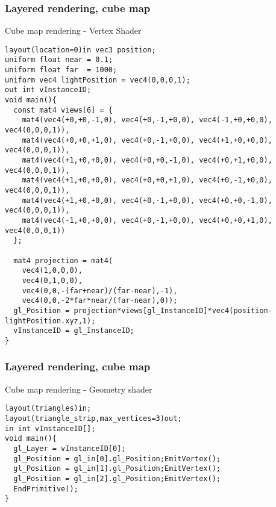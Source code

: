 \begin{frame}[fragile]
\frametitle{Layered rendering, cube map}
Cube map rendering - Vertex Shader
{\scriptsize
\begin{verbatim}
layout(location=0)in vec3 position;
uniform float near = 0.1;
uniform float far  = 1000;
uniform vec4 lightPosition = vec4(0,0,0,1);
out int vInstanceID;
void main(){
  const mat4 views[6] = {
    mat4(vec4(+0,+0,-1,0), vec4(+0,-1,+0,0), vec4(-1,+0,+0,0), vec4(0,0,0,1)),
    mat4(vec4(+0,+0,+1,0), vec4(+0,-1,+0,0), vec4(+1,+0,+0,0), vec4(0,0,0,1)),
    mat4(vec4(+1,+0,+0,0), vec4(+0,+0,-1,0), vec4(+0,+1,+0,0), vec4(0,0,0,1)),
    mat4(vec4(+1,+0,+0,0), vec4(+0,+0,+1,0), vec4(+0,-1,+0,0), vec4(0,0,0,1)),
    mat4(vec4(+1,+0,+0,0), vec4(+0,-1,+0,0), vec4(+0,+0,-1,0), vec4(0,0,0,1)),
    mat4(vec4(-1,+0,+0,0), vec4(+0,-1,+0,0), vec4(+0,+0,+1,0), vec4(0,0,0,1))
  };

  mat4 projection = mat4(
    vec4(1,0,0,0),
    vec4(0,1,0,0),
    vec4(0,0,-(far+near)/(far-near),-1),
    vec4(0,0,-2*far*near/(far-near),0));
  gl_Position = projection*views[gl_InstanceID]*vec4(position-lightPosition.xyz,1);
  vInstanceID = gl_InstanceID;
}
\end{verbatim}
}
\end{frame}


\begin{frame}[fragile]
\frametitle{Layered rendering, cube map}
Cube map rendering - Geometry shader
{\scriptsize
\begin{verbatim}
layout(triangles)in;
layout(triangle_strip,max_vertices=3)out;
in int vInstanceID[];
void main(){
  gl_Layer = vInstanceID[0];
  gl_Position = gl_in[0].gl_Position;EmitVertex();
  gl_Position = gl_in[1].gl_Position;EmitVertex();
  gl_Position = gl_in[2].gl_Position;EmitVertex();
  EndPrimitive();
}
\end{verbatim}
}
\end{frame}


